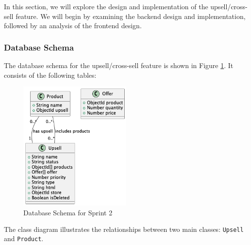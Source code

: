 In this section, we will explore the design and implementation of the upsell/cross-sell feature. We will begin by examining the backend design and implementation, followed by an analysis of the frontend design.

\subsubsection{Database Schema}

The database schema for the upsell/cross-sell feature is shown in Figure \ref{fig:db_schema_sprint2}. It consists of the following tables:

\begin{figure}[H]
    \centering
    \includegraphics[width=0.5\textwidth]{images/sprintTwoClass.png}
    \caption{Database Schema for Sprint 2}
    \label{fig:db_schema_sprint2}
\end{figure}

The class diagram illustrates the relationships between two main classes: \texttt{Upsell} and \texttt{Product}.

